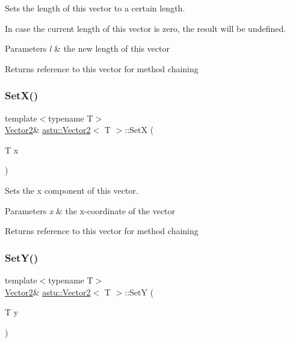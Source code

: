 Sets the length of this vector to a certain length.

In case the current length of this vector is zero, the result will be undefined.


\begin{DoxyParams}{Parameters}
{\em l} & the new length of this vector \\
\hline
\end{DoxyParams}
\begin{DoxyReturn}{Returns}
reference to this vector for method chaining 
\end{DoxyReturn}
\mbox{\label{classastu_1_1Vector2_adf5c57f8b6f337a4aa6eb79c0506d074}} 
\subsubsection{\texorpdfstring{Set\+X()}{SetX()}}
{\footnotesize\ttfamily template$<$typename T$>$ \\
\hyperlink{classastu_1_1Vector2}{Vector2}\& \hyperlink{classastu_1_1Vector2}{astu\+::\+Vector2}$<$ T $>$\+::SetX (\begin{DoxyParamCaption}\item[{T}]{x }\end{DoxyParamCaption})\hspace{0.3cm}{\ttfamily [inline]}}

Sets the x component of this vector.


\begin{DoxyParams}{Parameters}
{\em x} & the x-\/coordinate of the vector \\
\hline
\end{DoxyParams}
\begin{DoxyReturn}{Returns}
reference to this vector for method chaining 
\end{DoxyReturn}
\mbox{\label{classastu_1_1Vector2_af454152e76948f63a433a6343b5abaef}} 
\subsubsection{\texorpdfstring{Set\+Y()}{SetY()}}
{\footnotesize\ttfamily template$<$typename T$>$ \\
\hyperlink{classastu_1_1Vector2}{Vector2}\& \hyperlink{classastu_1_1Vector2}{astu\+::\+Vector2}$<$ T $>$\+::SetY (\begin{DoxyParamCaption}\item[{T}]{y }\end{DoxyParamCaption})\hspace{0.3cm}{\ttfamily [inline]}}

